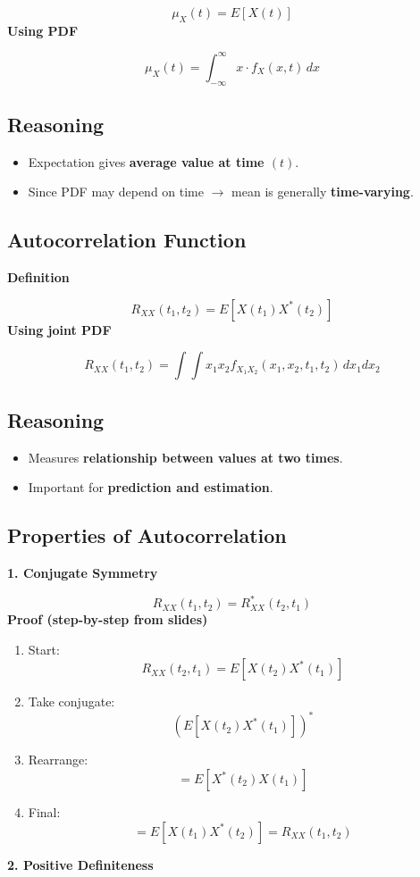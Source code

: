 \documentclass[12pt]{article}
\begin{document}
\[
\mu_X(t) = E[X(t)]
\]
\textbf{Using PDF}

\[
\mu_X(t) = \int_{-\infty}^{\infty} x \cdot f_X(x,t)\, dx
\]

\subsection*{Reasoning}

\begin{itemize}
\item Expectation gives \textbf{average value at time $(t)$}.
\item Since PDF may depend on time $\rightarrow$ mean is generally \textbf{time-varying}.
\end{itemize}

\subsection*{Autocorrelation Function}

\textbf{Definition}

\[
R_{XX}(t_1, t_2) = E[X(t_1)X^*(t_2)]
\]
\textbf{Using joint PDF}

\[
R_{XX}(t_1,t_2)=\int\int x_1 x_2 f_{X_1X_2}(x_1,x_2,t_1,t_2)\,dx_1dx_2
\]

\subsection*{Reasoning}

\begin{itemize}
\item Measures \textbf{relationship between values at two times}.
\item Important for \textbf{prediction and estimation}.
\end{itemize}

\subsection*{Properties of Autocorrelation}

\textbf{1. Conjugate Symmetry}

\[
R_{XX}(t_1,t_2) = R_{XX}^*(t_2,t_1)
\]
\textbf{Proof (step-by-step from slides)}
\begin{enumerate}
\item Start:
\[
R_{XX}(t_2,t_1) = E[X(t_2)X^*(t_1)]
\]
\item Take conjugate:
\[
(E[X(t_2)X^*(t_1)])^*
\]
\item Rearrange:
\[
= E[X^*(t_2)X(t_1)]
\]
\item Final:
\[
= E[X(t_1)X^*(t_2)] = R_{XX}(t_1,t_2)
\]
\end{enumerate}
\textbf{2. Positive Definiteness}
\end{document}
